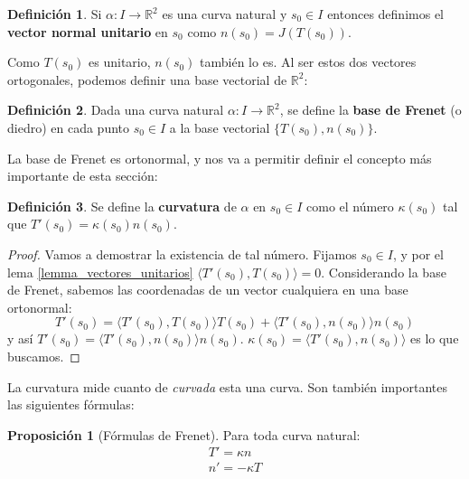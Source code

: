 \documentclass{article}
\theoremstyle{definition}
\newtheorem{prop}{Proposición}
\newtheorem{define}{Definición}
\newcommand{\reales}{\mathbb{R}}
\begin{document}
\begin{define}\label{def_curva_vector_normal1}
	Si $\alpha: I \rightarrow \reales^2$ es una curva natural y $s_0 \in I$ entonces definimos el \textbf{vector normal unitario} en $s_0$ como $n(s_0) = J(T(s_0))$.
\end{define}

Como $T(s_0)$ es unitario, $n(s_0)$ también lo es. Al ser estos dos vectores ortogonales, podemos definir una base vectorial de $\reales^2$:

\begin{define}
	Dada una curva natural $\alpha: I \rightarrow \reales^2$, se define la \textbf{base de Frenet} (o diedro) en cada punto $s_0 \in I$ a la base vectorial $\{T(s_0), n(s_0) \}$.
\end{define}

La base de Frenet es ortonormal, y nos va a permitir definir el concepto más importante de esta sección:

\begin{define}\label{def_curva_curvatura1}
	Se define la \textbf{curvatura} de $\alpha$ en $s_0 \in I$ como el número $\kappa(s_0)$ tal que $T'(s_0) = \kappa(s_0)n(s_0)$.
\end{define}

\begin{proof}
	Vamos a demostrar la existencia de tal número. Fijamos $s_0 \in I$, y por el lema \eqref{lemma_vectores_unitarios} $\langle T'(s_0), T(s_0) \rangle = 0$. Considerando la base de Frenet, sabemos las coordenadas de un vector cualquiera en una base ortonormal: 
	\begin{equation*}
		T'(s_0) = \langle T'(s_0), T(s_0) \rangle T(s_0) + \langle T'(s_0), n(s_0) \rangle n(s_0)
	\end{equation*}		
	y así $T'(s_0) = \langle T'(s_0), n(s_0) \rangle n(s_0)$. $\kappa(s_0) = \langle T'(s_0), n(s_0) \rangle$ es lo que buscamos.
\end{proof}

La curvatura mide cuanto de \textit{curvada} esta una curva. Son también importantes las siguientes fórmulas:

\begin{prop}[Fórmulas de Frenet]
	Para toda curva natural:
	\begin{eqnarray}
		T' = \kappa n \label{eq_frenet2d_1}\\ 
		n' = -\kappa T \label{eq_frenet2d_2}
	\end{eqnarray}
\end{prop}
\end{document}
